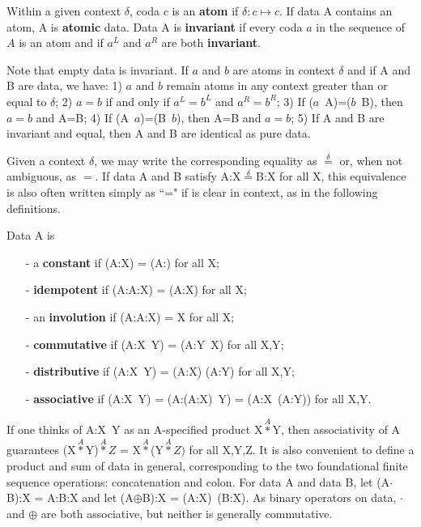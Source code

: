 \documentclass[11pt]{article}
\begin{document}
\begin{definition}
{Within a given context $\delta$, coda $c$ is an {\bf atom} if $\delta:c\mapsto c$.  If data A contains an atom, A is {\bf atomic} data. 
Data A is {\bf invariant} if every coda $a$ in the sequence of $A$ is an atom and if $a^L$ and $a^R$ are both {\bf invariant}. }
\end{definition}
\noindent Note that empty data is invariant.  If $a$ and $b$ are atoms in context $\delta$ and if A and B are data, we have: 
1) $a$ and $b$ remain atoms in any context greater than or equal to $\delta$; 2) $a=b$ if and only if $a^L=b^L$ and $a^R=b^R$; 3) If ($a$\ A)=($b$\ B), then $a=b$ and A=B; 
4) If (A\ $a$)=(B\ $b$), then A=B and $a=b$; 5) If A and B are invariant and equal, then A and B are identical as pure data. 

Given a context $\delta$, we may write the corresponding equality as ${\overset \delta =}$ or, when not ambiguous, as $=$. 
If data A and B satisfy A:X${\overset \delta =}$B:X for all X, this equivalence is also often written simply as ``=" if is clear in context, as in the following definitions. 

\begin{definition}
Data A is 
\begin{itemize}
\item[-]{a {\bf constant} if (A:X) = (A:) for all X};
\item[-]{{\bf idempotent} if (A:A:X) = (A:X) for all X}; 
\item[-]{an {\bf involution} if (A:A:X) = X for all X}; 
\item[-]{{\bf commutative} if (A:X\ Y) = (A:Y\ X) for all X,Y}; 
\item[-]{{\bf distributive} if (A:X\ Y) = (A:X) (A:Y) for all X,Y};
\item[-]{{\bf associative} if (A:X\ Y) = (A:(A:X)\ Y) = (A:X\ (A:Y)) for all X,Y.}
\end{itemize}
\end{definition}
\noindent 
If one thinks of A:X\ Y as an A-specified product X${\overset A *}$Y, then associativity of A guarantees 
(X${\overset A *}$Y)${\overset A *}Z$ = X${\overset A *}$(Y${\overset A *}Z)$ for all X,Y,Z.  
It is also convenient to define a product and sum of data in general, corresponding to the two foundational finite sequence operations: concatenation and colon.
For data A and data B, let (A$\cdot$B):X = A:B:X and let (A$\oplus$B):X = (A:X)\ (B:X).  As binary operators on data, $\cdot$ and $\oplus$ are both associative, but 
neither is generally commutative. 
\end{document}

